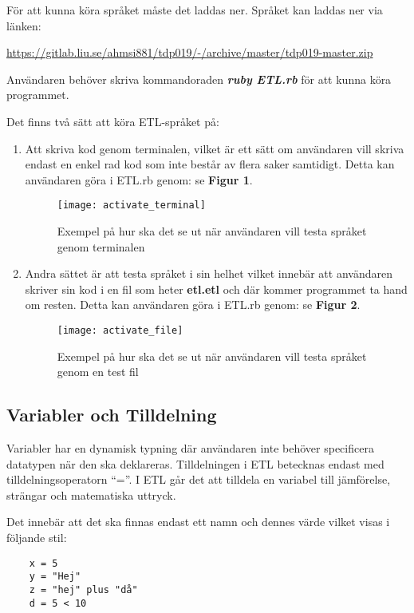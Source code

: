\documentclass{TDP019mall}
\begin{document}
För att kunna köra språket måste det laddas ner. Språket kan laddas ner via länken: 

\url{https://gitlab.liu.se/ahmsi881/tdp019/-/archive/master/tdp019-master.zip}

Användaren behöver skriva kommandoraden \textbf{\textit{ruby ETL.rb}} för att kunna köra programmet.

Det finns två sätt att köra ETL-språket på:
\begin{enumerate}
    \item Att skriva kod genom terminalen, vilket är ett sätt om användaren vill skriva endast en enkel rad kod som inte består av flera saker samtidigt.
    Detta kan användaren göra i ETL.rb genom: se \textbf{Figur 1}.

    \begin{figure}[h]
        \caption{Exempel på hur ska det se ut när användaren vill testa språket genom terminalen}
        \centering
        \texttt{[image: activate\_terminal]}
    \end{figure}

    \item Andra sättet är att testa språket i sin helhet vilket innebär att användaren skriver sin kod i en fil som heter \textbf{etl.etl} och där kommer 
    programmet ta hand om resten. Detta kan användaren göra i ETL.rb genom: se \textbf{Figur 2}.     

    \begin{figure}[h]
        \caption{Exempel på hur ska det se ut när användaren vill testa språket genom en test fil}
        \centering
        \texttt{[image: activate\_file]}
    \end{figure}

\end{enumerate}  

\newpage
\subsection{Variabler och Tilldelning}
Variabler har en dynamisk typning där användaren inte behöver specificera datatypen när den ska deklareras. Tilldelningen i ETL betecknas endast med 
tilldelningsoperatorn “=”. I ETL går det att tilldela en variabel till jämförelse, strängar och matematiska uttryck.

Det innebär att det ska finnas endast ett namn och dennes värde vilket visas i följande stil:
\begin{verbatim}
    x = 5 
    y = "Hej"
    z = "hej" plus "då"
    d = 5 < 10
\end{verbatim}
\end{document}
